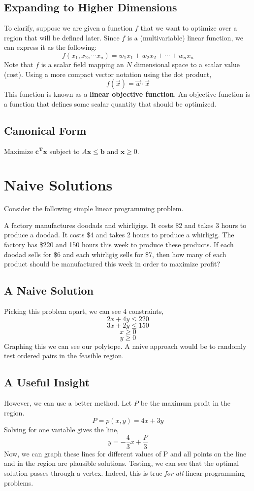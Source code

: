 \documentclass{article}
\begin{document}
\subsection{Expanding to Higher Dimensions}
To clarify, suppose we are given a function $f$ that we want to optimize over a region that will be defined later. 
Since $f$ is a (multivariable) linear function, we can express it as the following:
$$f(x_{1}, x_{2}, \cdots x_{n})=w_{1}x_{1}+w_{2}x_{2}+\cdots+w_{n}x_{n}$$
Note that $f$ is a scalar field mapping an $N$ dimensional space to a scalar value (cost).
Using a more compact vector notation using the dot product,
$$f(\vec{x})=\vec{w}\cdot\vec{x}$$
This function is known as a \textbf{linear objective function}. An objective function is a function that defines some 
scalar quantity that should be optimized.
\subsection{Canonical Form}
Maximize $\mathbf{c}^{\mathbf{T}}\mathbf{x}$ subject to $A\mathbf{x}\leq\mathbf{b}$ and $\mathbf{x}\geq 0$.
\section{Naive Solutions}
Consider the following simple linear programming problem. 
\begin{displayquote}
    A factory manufactures doodads and whirligigs. It costs \$2 and takes 3 hours to produce a doodad.
    It costs \$4 and takes 2 hours to produce a whirligig. The factory has \$220 and 150 hours this week
    to produce these products. If each doodad sells for \$6 and each whirligig sells for \$7,
    then how many of each product should be manufactured this week in order to maximize profit?
\end{displayquote}
\subsection{A Naive Solution}
Picking this problem apart, we can see 4 constraints,
$$2x+4y\leq 220$$
$$3x+2y\leq 150$$
$$x\geq 0$$
$$y\geq 0$$
Graphing this we can see our polytope. A naive approach would be to randomly test ordered pairs in the feasible region.
\subsection{A Useful Insight}
However, we can use a better method. Let $P$ be the maximum profit in the region.
$$P=p(x,y)=4x+3y$$
Solving for one variable gives the line,
$$y=-\frac{4}{3}x+\frac{P}{3}$$
Now, we can graph these lines for different values of P and all points on the line and in the region are plausible solutions.
Testing, we can see that the optimal solution passes through a vertex. Indeed, this is true {\it for all} linear programming problems.
\end{document}
